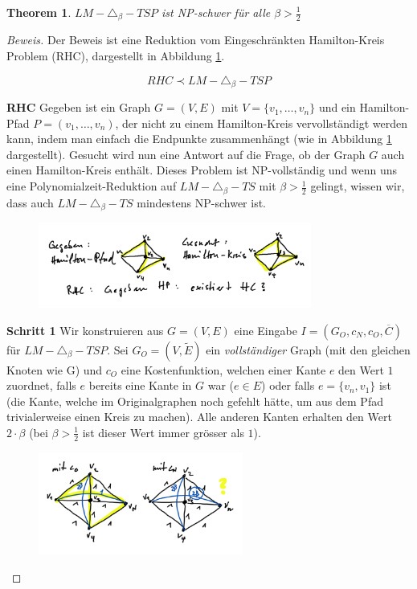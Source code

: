 \documentclass[a4paper,11pt]{scrreprt}
\begin{document}
\newtheorem{t2}{Theorem}

\begin{t2}
$LM-\triangle_\beta-TSP$ ist NP-schwer für alle $\beta > \frac{1}{2}$
\end{t2}

\begin{proof}[Beweis]
Der Beweis ist eine Reduktion vom Eingeschränkten Hamilton-Kreis Problem (RHC), dargestellt in Abbildung \ref{fig:rhc-reduction-step1}. 

\[ RHC \prec LM-\triangle_\beta-TSP \]

\textbf{RHC} Gegeben ist ein Graph $G = (V, E)$ mit $V = \{v_1, \dots, v_n\}$ und ein Hamilton-Pfad $P = (v_1, \dots, v_n)$, der nicht zu einem Hamilton-Kreis vervollständigt werden kann, indem man einfach die Endpunkte zusammenhängt (wie in Abbildung \ref{fig:rhc-reduction-step1} dargestellt). Gesucht wird nun eine Antwort auf die Frage, ob der Graph $G$ auch einen Hamilton-Kreis enthält. Dieses Problem ist NP-vollständig und wenn uns eine Polynomialzeit-Reduktion auf $LM-\triangle_\beta-TS$ mit $\beta > \frac{1}{2}$ gelingt, wissen wir, dass auch $LM-\triangle_\beta-TS$ mindestens NP-schwer ist.

\begin{figure}[H]
\centering
\includegraphics[width=0.8\textwidth]{rhc_reduction_step1.png}
\caption{}
\label{fig:rhc-reduction-step1}
\end{figure}

\textbf{Schritt 1} Wir konstruieren aus $G = (V, E)$ eine Eingabe $I = (G_O, c_N, c_O, \overline{C})$ für $LM-\triangle_\beta-TSP$. Sei $G_O = (V, \tilde{E})$ ein \emph{vollständiger} Graph (mit den gleichen Knoten wie G) und $c_O$ eine Kostenfunktion, welchen einer Kante $e$ den Wert $1$ zuordnet, falls $e$ bereits eine Kante in $G$ war ($e \in E$) oder falls $e = \{v_n, v_1\}$ ist (die Kante, welche im Originalgraphen noch gefehlt hätte, um aus dem Pfad trivialerweise einen Kreis zu machen). Alle anderen Kanten erhalten den Wert $2 \cdot \beta$ (bei $\beta > \frac{1}{2}$ ist dieser Wert immer grösser als $1$). 

\begin{figure}[H]
\centering
\includegraphics[width=0.6\textwidth]{rhc_reduction_step3.png}
\caption{}
\label{fig:rhc-reduction-step3}
\end{figure}


\end{proof}
\end{document}

